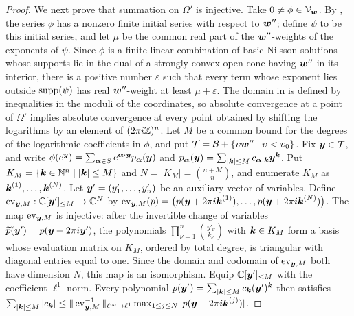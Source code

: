 \begin{proof}
	We next prove that summation on \(\Omega'\) is injective.
	Take \(0\ne\phi\in\mathcal V_{\boldsymbol{w}}\).
	By \cite[Proposition~2.5.2]{SST00}, the series \(\phi\) has a nonzero finite initial series with respect to \(\boldsymbol{w}''\); define \(\psi\) to be this initial series, and let \(\mu\) be the common real part of the \(\boldsymbol{w}''\)-weights of the exponents of \(\psi\).
	Since \(\phi\) is a finite linear combination of basic Nilsson solutions whose supports lie in the dual of a strongly convex open cone having \(\boldsymbol{w}''\) in its interior, there is a positive number \(\varepsilon\) such that every term whose exponent lies outside \(\operatorname{supp}(\psi)\) has real \(\boldsymbol{w}''\)-weight at least \(\mu+\varepsilon\).
	The domain in \cite[Notation~6.1]{DMM12} is defined by inequalities in the moduli of the coordinates, so absolute convergence at a point of \(\Omega'\) implies absolute convergence at every point obtained by shifting the logarithms by an element of \((2\pi i\mathbb Z)^n\).
	Let \(M\) be a common bound for the degrees of the logarithmic coefficients in \(\phi\), and put \(\mathcal T = \mathcal B+\{\upsilon\boldsymbol{w}''\mid \upsilon<\upsilon_0\}\).
	Fix \(\boldsymbol{y}\in\mathcal T\), and write \(\phi(e^{\boldsymbol{y}}) = \sum_{\boldsymbol{\alpha}\in S} e^{\boldsymbol{\alpha}\cdot\boldsymbol{y}}p_{\boldsymbol{\alpha}}(\boldsymbol{y})\) and \(p_{\boldsymbol{\alpha}}(\boldsymbol{y}) = \sum_{|\boldsymbol{k}|\leq M}c_{\boldsymbol{\alpha},\boldsymbol{k}}\boldsymbol{y}^{\boldsymbol{k}}\).
	Put \(K_M = \{\boldsymbol{k}\in\mathbb N^n\mid |\boldsymbol{k}|\leq M\}\) and \(N = |K_M| = \binom{n+M}{n}\), and enumerate \(K_M\) as \(\boldsymbol{k}^{(1)},\ldots,\boldsymbol{k}^{(N)}\).
	Let \(\boldsymbol{y}'=(y'_1,\ldots,y'_n)\) be an auxiliary vector of variables.
	Define \(\operatorname{ev}_{\boldsymbol{y},M}:\mathbb C[\boldsymbol{y}']_{\leq M}\to\mathbb C^N\) by \(\operatorname{ev}_{\boldsymbol{y},M}(p)=\bigl(p(\boldsymbol{y}+2\pi i\boldsymbol{k}^{(1)}),\ldots,p(\boldsymbol{y}+2\pi i\boldsymbol{k}^{(N)})\bigr)\).
	The map \(\operatorname{ev}_{\boldsymbol{y},M}\) is injective: after the invertible change of variables \(\widetilde p(\boldsymbol{y}')=p(\boldsymbol{y}+2\pi i\boldsymbol{y}')\), the polynomials \(\prod_{\nu=1}^{n}\binom{y'_\nu}{k_\nu}\) with \(\boldsymbol{k}\in K_M\) form a basis whose evaluation matrix on \(K_M\), ordered by total degree, is triangular with diagonal entries equal to one.
	Since the domain and codomain of \(\operatorname{ev}_{\boldsymbol{y},M}\) both have dimension \(N\), this map is an isomorphism.
	Equip \(\mathbb C[\boldsymbol{y}']_{\leq M}\) with the coefficient \(\ell^1\)-norm.
	Every polynomial \(p(\boldsymbol{y}')=\sum_{|\boldsymbol{k}|\leq M}c_{\boldsymbol{k}}(\boldsymbol{y}')^{\boldsymbol{k}}\) then satisfies \(\sum_{|\boldsymbol{k}|\leq M}|c_{\boldsymbol{k}}|\leq\|\operatorname{ev}_{\boldsymbol{y},M}^{-1}\|_{\ell^\infty\to\ell^1}\max_{1\leq j\leq N}|p(\boldsymbol{y}+2\pi i\boldsymbol{k}^{(j)})|\).


\end{proof}
